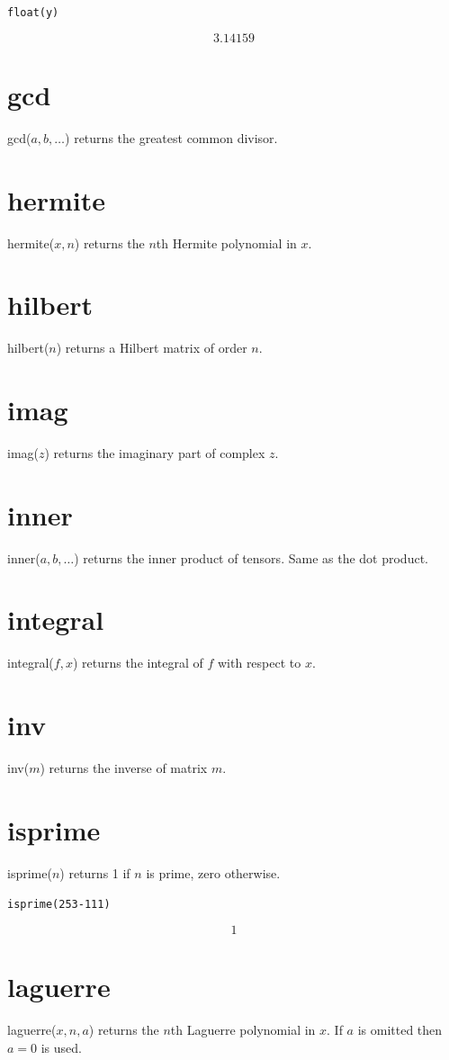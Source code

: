 \documentclass[11pt]{article}
\begin{document}
{\tt float(y)}

$$3.14159$$

\section*{gcd}
gcd($a,b,\ldots$) returns the greatest common divisor.

\section*{hermite}
hermite($x,n$) returns the $n$th Hermite polynomial in $x$.

\section*{hilbert}
hilbert($n$) returns a Hilbert matrix of order $n$.

\section*{imag}
imag($z$) returns the imaginary part of complex $z$.

\section*{inner}
inner($a,b,\ldots$) returns the inner product of tensors.
Same as the dot product.

\section*{integral}
integral($f,x$) returns the integral of $f$ with respect to $x$.

\section*{inv}
inv($m$) returns the inverse of matrix $m$.

\section*{isprime}
isprime($n$) returns 1 if $n$ is prime, zero otherwise.

\medskip
{\tt isprime(2{}53-111)}

$$1$$

\section*{laguerre}
laguerre($x,n,a$) returns the $n$th Laguerre polynomial in $x$.
If $a$ is omitted then $a=0$ is used.
\end{document}

